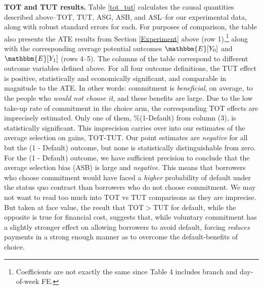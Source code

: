 \documentclass[ecta,nameyear,final]{econsocart}
\begin{document}
\noindent \textbf{TOT and TUT results.} Table \ref{tot_tut} calculates the causal quantities described above--TOT, TUT, ASG, ASB, and ASL--for our experimental data, along with robust standard errors for each. 
For purposes of comparison, the table also presents the ATE results from Section \ref{Experiment} above (row 1),\footnote{Coefficients are not exactly the same since Table 4 includes branch and day-of-week FE.} along with the corresponding average potential outcomes $\mathbbm{E}[Y_0]$ and $\mathbbm{E}[Y_1]$ (rows 4--5).
The columns of the table correspond to different outcome variables defined above.
For all four outcome definitions, the TUT effect is positive, statistically and economically significant, and comparable in magnitude to the ATE.
In other words: commitment is \emph{beneficial}, on average, to the people who \emph{would not choose it}, and these benefits are large.
Due to the low take-up rate of commitment in the choice arm, the corresponding TOT effects are imprecisely estimated. Only one of them, \%(1-Default) from column (3), is statistically significant. 
This imprecision carries over into our estimates of the average selection on gains, TOT-TUT. Our point estimates are \emph{negative} for all but the (1 - Default) outcome, but none is statistically distinguishable from zero.  
For the (1 - Default) outcome, we have sufficient precision to conclude that the average selection bias (ASB) is large and \emph{negative}.
This means that borrowers who choose commitment would have faced a \emph{higher} probability of default under the status quo contract than borrowers who do not choose commitment.  We may not want to read too much into TOT vs TUT comparisons as they are imprecise. But taken at face value, the result that TOT$>$TUT for default, while the opposite is true for financial cost, suggests that, while voluntary commitment has a slightly stronger effect on allowing borrowers to avoid default, forcing \textit{reduces} payments in a strong enough manner as to overcome the default-benefits of choice.  
\end{document}
